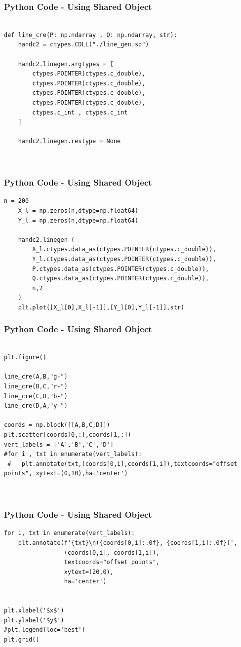 \documentclass{beamer}
\begin{document}
\begin{frame}[fragile]
    \frametitle{Python Code - Using Shared Object}
    \begin{lstlisting}

def line_cre(P: np.ndarray , Q: np.ndarray, str):
    handc2 = ctypes.CDLL("./line_gen.so")

    handc2.linegen.argtypes = [
        ctypes.POINTER(ctypes.c_double),
        ctypes.POINTER(ctypes.c_double),
        ctypes.POINTER(ctypes.c_double),
        ctypes.POINTER(ctypes.c_double),
        ctypes.c_int , ctypes.c_int
    ]

    handc2.linegen.restype = None
    


\end{lstlisting}
\end{frame}
\begin{frame}[fragile]
    \frametitle{Python Code - Using Shared Object}
    \begin{lstlisting}
n = 200
    X_l = np.zeros(n,dtype=np.float64)
    Y_l = np.zeros(n,dtype=np.float64)

    handc2.linegen (
        X_l.ctypes.data_as(ctypes.POINTER(ctypes.c_double)),
        Y_l.ctypes.data_as(ctypes.POINTER(ctypes.c_double)),
        P.ctypes.data_as(ctypes.POINTER(ctypes.c_double)),
        Q.ctypes.data_as(ctypes.POINTER(ctypes.c_double)),
        n,2
    )
    plt.plot([X_l[0],X_l[-1]],[Y_l[0],Y_l[-1]],str)

    \end{lstlisting}
\end{frame}

\begin{frame}[fragile]
    \frametitle{Python Code - Using Shared Object}
    \begin{lstlisting}

plt.figure()

line_cre(A,B,"g-")
line_cre(B,C,"r-")
line_cre(C,D,"b-")
line_cre(D,A,"y-")

coords = np.block([[A,B,C,D]])
plt.scatter(coords[0,:],coords[1,:])
vert_labels = ['A','B','C','D']
#for i , txt in enumerate(vert_labels):
 #   plt.annotate(txt,(coords[0,i],coords[1,i]),textcoords="offset points", xytext=(0,10),ha='center')



\end{lstlisting}
\end{frame}

\begin{frame}[fragile]
    \frametitle{Python Code - Using Shared Object}
    \begin{lstlisting}
for i, txt in enumerate(vert_labels):
    plt.annotate(f'{txt}\n({coords[0,i]:.0f}, {coords[1,i]:.0f})',
                 (coords[0,i], coords[1,i]),
                 textcoords="offset points",
                 xytext=(20,0),
                 ha='center')


plt.xlabel('$x$')
plt.ylabel('$y$')
#plt.legend(loc='best')
plt.grid()
\end{lstlisting}
\end{frame}
\end{document}
